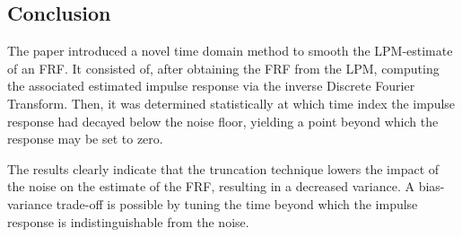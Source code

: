 \subsection{Conclusion}\label{se:conclusion}

The paper introduced a novel time domain method to smooth the LPM-estimate of an FRF. It consisted of, after obtaining the FRF from the LPM, computing the associated estimated impulse response via the inverse Discrete Fourier Transform. Then, it was determined statistically at which time index the impulse response had decayed below the noise floor, yielding a point beyond which the response may be set to zero.

The results clearly indicate that the truncation technique lowers the impact of the noise on the estimate of the FRF, resulting in a decreased variance. A bias-variance trade-off is possible by tuning the time beyond which the impulse response is indistinguishable from the noise. %


% 
% 
% 
